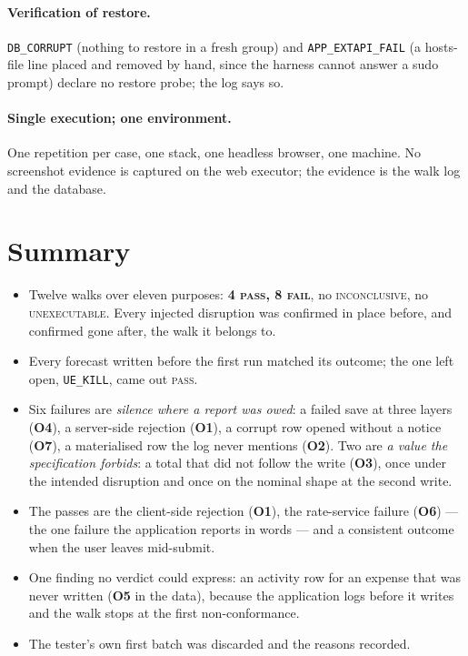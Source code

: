 \documentclass[11pt,a4paper]{article}
\newcommand{\gate}[1]{\texttt{\small #1}}
\newcommand{\obl}[1]{\textbf{O#1}}
\begin{document}
\paragraph{Verification of restore.}
\gate{DB\_CORRUPT} (nothing to restore in a fresh group) and
\gate{APP\_EXTAPI\_FAIL} (a hosts-file line placed and removed by hand, since the
harness cannot answer a sudo prompt) declare no restore probe; the log says so.

\paragraph{Single execution; one environment.}
One repetition per case, one stack, one headless browser, one machine. No
screenshot evidence is captured on the web executor; the evidence is the walk
log and the database.

\section{Summary}
\label{sec:summary}

\begin{itemize}\setlength\itemsep{2pt}
  \item Twelve walks over eleven purposes: \textbf{4 \textsc{pass}, 8
        \textsc{fail}}, no \textsc{inconclusive}, no \textsc{unexecutable}.
        Every injected disruption was confirmed in place before, and confirmed
        gone after, the walk it belongs to.
  \item Every forecast written before the first run matched its outcome; the
        one left open, \gate{UE\_KILL}, came out \textsc{pass}.
  \item Six failures are \emph{silence where a report was owed}: a failed save
        at three layers (\obl{4}), a server-side rejection (\obl{1}), a corrupt
        row opened without a notice (\obl{7}), a materialised row the log never
        mentions (\obl{2}). Two are \emph{a value the specification forbids}: a
        total that did not follow the write (\obl{3}), once under the intended
        disruption and once on the nominal shape at the second write.
  \item The passes are the client-side rejection (\obl{1}), the rate-service
        failure (\obl{6}) --- the one failure the application reports in words
        --- and a consistent outcome when the user leaves mid-submit.
  \item One finding no verdict could express: an activity row for an expense
        that was never written (\obl{5} in the data), because the application
        logs before it writes and the walk stops at the first non-conformance.
  \item The tester's own first batch was discarded and the reasons recorded.
\end{itemize}
\end{document}

